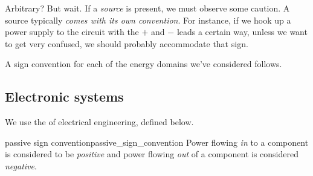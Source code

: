\documentclass[dynamic_systems.tex]{subfiles}
\begin{document}
Arbitrary? 
But wait.
If a \emph{source} is present, we must observe some caution.
A source typically \emph{comes with its own convention}.
For instance, if we hook up a power supply to the circuit with the $+$ and $-$ leads a certain way, unless we want to get very confused, we should probably accommodate that sign.
\tags{}

A sign convention for each of the energy domains we've considered follows.
\tags{}

\subsection{Electronic systems}
\tags{}

We use the  of electrical engineering, defined below.
\tags{}

\begin{Definition}{passive sign convention}{passive_sign_convention}
	Power flowing \emph{in} to a component is considered to be \emph{positive} and power flowing \emph{out} of a component is considered \emph{negative}.
\end{Definition}
\end{document}

